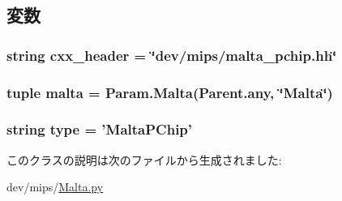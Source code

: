 \subsection{変数}
\hypertarget{classMalta_1_1MaltaPChip_a17da7064bc5c518791f0c891eff05fda}{
\subsubsection[{cxx\_\-header}]{\setlength{\rightskip}{0pt plus 5cm}string {\bf cxx\_\-header} = \char`\"{}dev/mips/malta\_\-pchip.hh\char`\"{}}}
\label{classMalta_1_1MaltaPChip_a17da7064bc5c518791f0c891eff05fda}
\hypertarget{classMalta_1_1MaltaPChip_ae688b1cb082350c971cc4aaf26b66104}{
\subsubsection[{malta}]{\setlength{\rightskip}{0pt plus 5cm}tuple {\bf malta} = Param.Malta(Parent.any, \char`\"{}Malta\char`\"{})}}
\label{classMalta_1_1MaltaPChip_ae688b1cb082350c971cc4aaf26b66104}
\hypertarget{classMalta_1_1MaltaPChip_acce15679d830831b0bbe8ebc2a60b2ca}{
\subsubsection[{type}]{\setlength{\rightskip}{0pt plus 5cm}string {\bf type} = '{\bf MaltaPChip}'}}
\label{classMalta_1_1MaltaPChip_acce15679d830831b0bbe8ebc2a60b2ca}


このクラスの説明は次のファイルから生成されました:\begin{DoxyCompactItemize}
\item 
dev/mips/\hyperlink{Malta_8py}{Malta.py}\end{DoxyCompactItemize}

